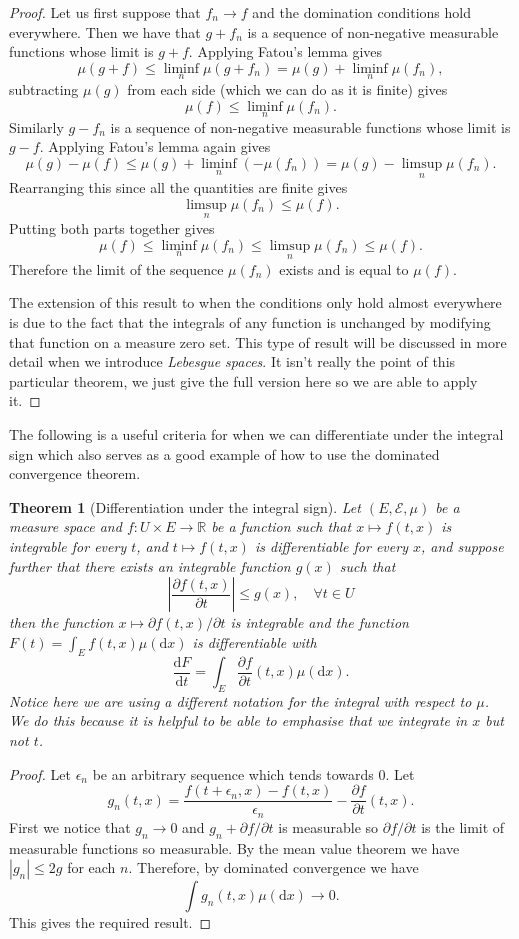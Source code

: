 \documentclass[11pt]{article}
\newtheorem{thm}{Theorem}[section]
\theoremstyle{definition}
\theoremstyle{remark}
\begin{document}
\begin{proof}
Let us first suppose that $f_n \rightarrow f$ and the domination conditions hold everywhere. Then we have that $g+f_n$ is a sequence of non-negative measurable functions whose limit is $g+f$. Applying Fatou's lemma gives
\[ \mu(g+f) \leq \liminf_n \mu(g+f_n) = \mu(g) + \liminf_n \mu(f_n), \] subtracting $\mu(g)$ from each side (which we can do as it is finite) gives
\[ \mu(f) \leq \liminf_n \mu(f_n). \] Similarly $g-f_n$ is a sequence of non-negative measurable functions whose limit is $g-f$. Applying Fatou's lemma again gives
\[ \mu(g) - \mu(f) \leq \mu(g) + \liminf_n (-\mu(f_n)) = \mu(g) - \limsup_n \mu(f_n). \] Rearranging this since all the quantities are finite gives
\[ \limsup_n \mu(f_n) \leq \mu(f). \] Putting both parts together gives
\[ \mu(f) \leq \liminf_n \mu(f_n) \leq \limsup_n \mu(f_n) \leq \mu(f). \] Therefore the limit of the sequence $\mu(f_n)$ exists and is equal to $\mu(f)$.

The extension of this result to when the conditions only hold almost everywhere is due to the fact that the integrals of any function is unchanged by modifying that function on a measure zero set. This type of result will be discussed in more detail when we introduce \emph{Lebesgue spaces}. It isn't really the point of this particular theorem, we just give the full version here so we are able to apply it. 
\end{proof}

The following is a useful criteria for when we can differentiate under the integral sign which also serves as a good example of how to use the dominated convergence theorem.
\begin{thm}[Differentiation under the integral sign]
Let $(E, \mathcal{E}, \mu)$ be a measure space and $f: U \times E \rightarrow \mathbb{R}$ be a function such that $x \mapsto f(t,x)$ is integrable for every $t$, and $t \mapsto f(t,x)$ is differentiable for every $x$, and suppose further that there exists an integrable function $g(x)$ such that
\[ \left| \frac{\partial f(t,x)}{\partial t} \right| \leq g(x), \quad \forall t \in U \] then the function $x \mapsto \partial f(t,x)/ \partial t$ is integrable and the function $F(t) = \int_E f(t,x) \mu(\mathrm{d}x)$ is differentiable with
\[ \frac{\mathrm{d}F}{\mathrm{d}t} = \int_E \frac{\partial f}{\partial t}(t,x) \mu(\mathrm{d}x). \] Notice here we are using a different notation for the integral with respect to $\mu$. We do this because it is helpful to be able to emphasise that we integrate in $x$ but not $t$. 
\end{thm}
\begin{proof} 
Let $\epsilon_n$ be an arbitrary sequence which tends towards $0$. Let 
\[ g_n(t,x) = \frac{f(t+\epsilon_n,x) - f(t,x)}{\epsilon_n} - \frac{\partial f}{\partial t}(t,x). \] First we notice that $g_n \rightarrow 0$ and $g_n + \partial f/\partial t$ is measurable so $\partial f/ \partial t$ is the limit of measurable functions so measurable. By the mean value theorem we have $|g_n| \leq 2g$ for each $n$. Therefore, by dominated convergence we have
\[ \int g_n(t,x) \mu(\mathrm{d}x) \rightarrow 0.  \] This gives the required result.
\end{proof}
\end{document}
